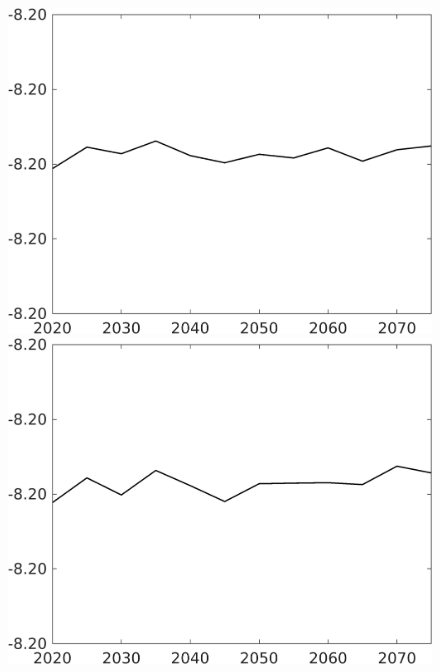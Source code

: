 \begin{figure}[h!!]
\begin{minipage}[]{0.32\textwidth}
	\end{minipage}	
	\begin{minipage}[]{0.32\textwidth}
	\includegraphics[width=1\textwidth]{../../codding_model/own_basedOnFried/optimalPol_010922_revision/figures/all_13Sept22/CompTaul_Equlab_LFBAUPer_Reg0_F_spillover0_nsk1_xgr1_knspil1_sep1_countec0_GovRev0_etaa0.79.png}
\end{minipage}	
\begin{minipage}[]{0.32\textwidth}
\includegraphics[width=1\textwidth]{../../codding_model/own_basedOnFried/optimalPol_010922_revision/figures/all_13Sept22/CompTaul_Equlab_LFBAUPer_Reg0_G_spillover0_nsk1_xgr1_knspil1_sep1_countec0_GovRev0_etaa0.79.png}

\end{minipage}
\end{figure}
